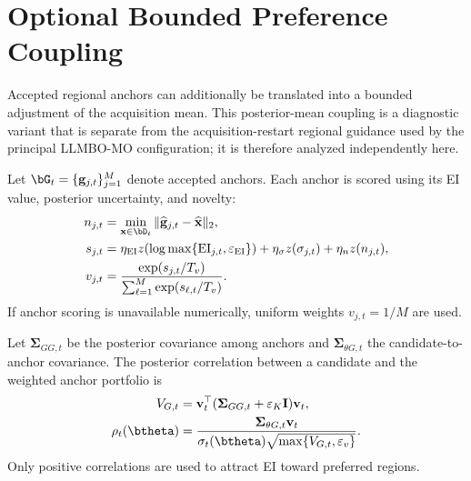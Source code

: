 \appendices

\section{Optional Bounded Preference Coupling}
\label{app:coupling}

Accepted regional anchors can additionally be translated into a bounded
adjustment of the acquisition mean.
This posterior-mean coupling is a diagnostic variant that is separate from the
acquisition-restart regional guidance used by the principal LLMBO-MO
configuration; it is therefore analyzed independently here.

Let $\bG_t=\{\mathbf g_{j,t}\}_{j=1}^{M}$ denote accepted anchors.
Each anchor is scored using its EI value, posterior uncertainty, and novelty:
\begin{equation}
\begin{aligned}
n_{j,t}
&=\min_{\mathbf x\in\bD_t}
\|\widehat{\mathbf g}_{j,t}-\widehat{\mathbf x}\|_2,\\
s_{j,t}
&=\eta_{\mathrm{EI}}z\!\left(
\log\max\{\mathrm{EI}_{j,t},\varepsilon_{\mathrm{EI}}\}\right)
+\eta_\sigma z(\sigma_{j,t})+\eta_n z(n_{j,t}),\\
v_{j,t}
&=\frac{\exp(s_{j,t}/T_v)}
{\sum_{\ell=1}^{M}\exp(s_{\ell,t}/T_v)}.
\end{aligned}
\label{eq:anchor_weights}
\end{equation}
If anchor scoring is unavailable numerically, uniform weights
$v_{j,t}=1/M$ are used.

Let $\boldsymbol\Sigma_{GG,t}$ be the posterior covariance among anchors and
$\boldsymbol\Sigma_{\theta G,t}$ the candidate-to-anchor covariance.
The posterior correlation between a candidate and the weighted anchor portfolio
is
\begin{equation}
\begin{aligned}
V_{G,t}
&=\mathbf v_t^\top
(\boldsymbol\Sigma_{GG,t}+\varepsilon_K\mathbf I)\mathbf v_t,\\
\rho_t(\btheta)
&=\frac{\boldsymbol\Sigma_{\theta G,t}\mathbf v_t}
{\sigma_t(\btheta)\sqrt{\max\{V_{G,t},\varepsilon_v\}}}.
\end{aligned}
\label{eq:covariance_projection}
\end{equation}
Only positive correlations are used to attract EI toward preferred regions.

